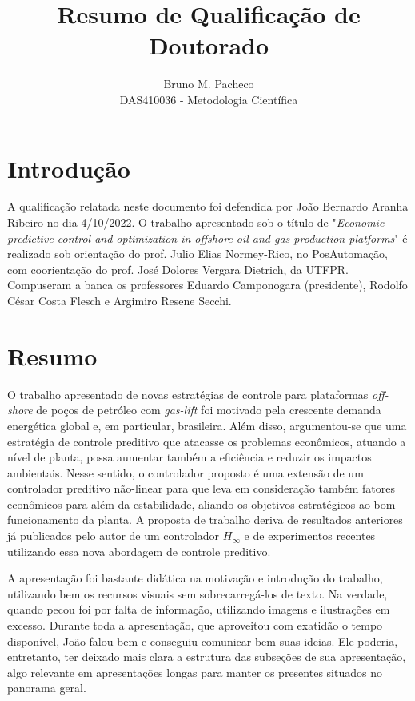 \documentclass[a4paper]{report}
\begin{document}
 
\title{Resumo de Qualificação de Doutorado}
\author{Bruno M. Pacheco\\
DAS410036 - Metodologia Científica}
 
\maketitle

\section{Introdução}

A qualificação relatada neste documento foi defendida por João Bernardo Aranha Ribeiro no dia 4/10/2022.
O trabalho apresentado sob o título de "\emph{Economic predictive control and optimization in offshore oil and gas production platforms}" é realizado sob orientação do prof. Julio Elias Normey-Rico, no PosAutomação, com coorientação do prof. José Dolores Vergara Dietrich, da UTFPR.
Compuseram a banca os professores Eduardo Camponogara (presidente), Rodolfo César Costa Flesch e Argimiro Resene Secchi.

\section{Resumo}

O trabalho apresentado de novas estratégias de controle para plataformas \emph{off-shore} de poços de petróleo com \emph{gas-lift} foi motivado pela crescente demanda energética global e, em particular, brasileira.
Além disso, argumentou-se que uma estratégia de controle preditivo que atacasse os problemas econômicos, atuando a nível de planta, possa aumentar também a eficiência e reduzir os impactos ambientais.
Nesse sentido, o controlador proposto é uma extensão de um controlador preditivo não-linear para que leva em consideração também fatores econômicos para além da estabilidade, aliando os objetivos estratégicos ao bom funcionamento da planta.
A proposta de trabalho deriva de resultados anteriores já publicados pelo autor de um controlador $H_{\infty}$ e de experimentos recentes utilizando essa nova abordagem de controle preditivo.

A apresentação foi bastante didática na motivação e introdução do trabalho, utilizando bem os recursos visuais sem sobrecarregá-los de texto.
Na verdade, quando pecou foi por falta de informação, utilizando imagens e ilustrações em excesso.
Durante toda a apresentação, que aproveitou com exatidão o tempo disponível, João falou bem e conseguiu comunicar bem suas ideias.
Ele poderia, entretanto, ter deixado mais clara a estrutura das subseções de sua apresentação, algo relevante em apresentações longas para manter os presentes situados no panorama geral.
\end{document}
